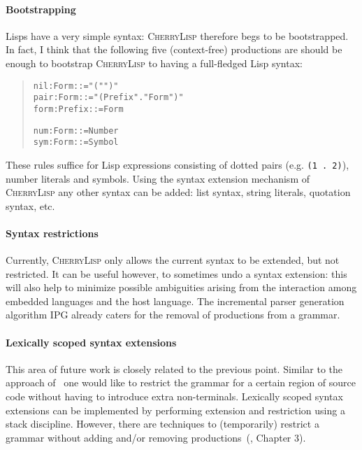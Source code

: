 \documentclass[a4paper]{llncs}
\def\cherrylisp{\textsc{CherryLisp}\xspace}
\begin{document}
\paragraph{Bootstrapping} Lisps have a very simple syntax: \cherrylisp
therefore begs to be bootstrapped. In fact, I think that the following
five (context-free) productions are should be enough to bootstrap
\cherrylisp to having a full-fledged Lisp syntax:
\begin{quote}\small
\begin{minipage}[t]{0.6\linewidth}
\begin{alltt}
nil:Form    ::= "(" ")"
pair:Form   ::= "( Prefix "." Form ")"
form:Prefix ::= Form
\end{alltt}
\end{minipage}
\begin{minipage}[t]{0.4\linewidth}
\begin{alltt}
num:Form ::= Number
sym:Form ::= Symbol
\end{alltt}
\end{minipage}
\end{quote}
These rules suffice for Lisp expressions consisting of dotted pairs
(e.g. \texttt{(1 . 2)}), number literals and symbols. Using the syntax
extension mechanism of \cherrylisp any other syntax can be added: list
syntax, string literals, quotation syntax, etc.

\paragraph{Syntax restrictions} Currently, \cherrylisp only allows the
current syntax to be extended, but not restricted. It can be useful
however, to sometimes undo a syntax extension: this will also help
to minimize possible ambiguities arising from the interaction among
embedded languages and the host language. The incremental parser
generation algorithm IPG already caters for the removal of productions
from a grammar.


\paragraph{Lexically scoped syntax extensions} This area of future
work is closely related to the previous point. Similar to the approach
of~\cite{ExtensibleSyntax} one would like to restrict the grammar for
a certain region of source code without having to introduce extra
non-terminals. Lexically scoped syntax extensions can be implemented
by performing extension and restriction using a stack
discipline. However, there are techniques to (temporarily) restrict a
grammar without adding and/or removing
productions~(\cite{RekersThesis}, Chapter 3).
\end{document}
